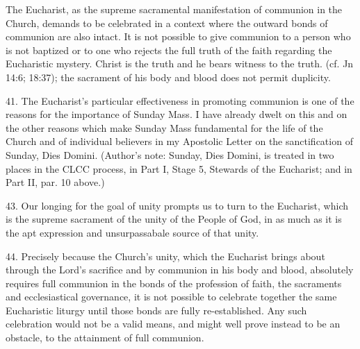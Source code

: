 \documentclass[oneside]{book}
\begin{document}
The Eucharist, as the supreme sacramental manifestation of communion in the
Church, demands to be celebrated in a context where the outward bonds of
communion are also intact. It is not possible to give communion to a person who
is not baptized or to one who rejects the full truth of the faith regarding the
Eucharistic mystery. Christ is the truth and he bears witness to the
truth. (cf. Jn 14:6; 18:37); the sacrament of his body and blood does not permit
duplicity.


41. The Eucharist's particular effectiveness in promoting communion is one of
the reasons for the importance of Sunday Mass. I have already dwelt on this and
on the other reasons which make Sunday Mass fundamental for the life of the
Church and of individual believers in my Apostolic Letter on the sanctification
of Sunday, Dies Domini. (Author's note: Sunday, Dies Domini, is treated in two
places in the CLCC process, in Part I, Stage 5, Stewards of the Eucharist; and
in Part II, par. 10 above.)

43. Our longing for the goal of unity prompts us to turn to the Eucharist, which
is the supreme sacrament of the unity of the People of God, in as much as it is
the apt expression and unsurpassabale source of that unity.

44. Precisely because the Church's unity, which the Eucharist brings about
through the Lord's sacrifice and by communion in his body and blood, absolutely
requires full communion in the bonds of the profession of faith, the sacraments
and ecclesiastical governance, it is not possible to celebrate together the same
Eucharistic liturgy until those bonds are fully re-established. Any such
celebration would not be a valid means, and might well prove instead to be an
obstacle, to the attainment of full communion.
\end{document}
